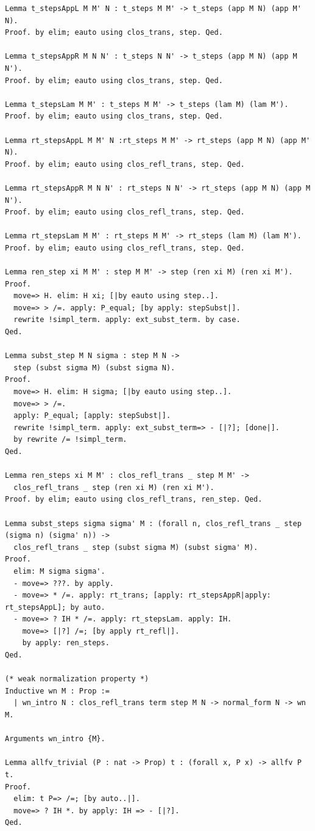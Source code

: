 \begin{lstlisting}
Lemma t_stepsAppL M M' N : t_steps M M' -> t_steps (app M N) (app M' N).
Proof. by elim; eauto using clos_trans, step. Qed.

Lemma t_stepsAppR M N N' : t_steps N N' -> t_steps (app M N) (app M N').
Proof. by elim; eauto using clos_trans, step. Qed.

Lemma t_stepsLam M M' : t_steps M M' -> t_steps (lam M) (lam M').
Proof. by elim; eauto using clos_trans, step. Qed.

Lemma rt_stepsAppL M M' N :rt_steps M M' -> rt_steps (app M N) (app M' N).
Proof. by elim; eauto using clos_refl_trans, step. Qed.

Lemma rt_stepsAppR M N N' : rt_steps N N' -> rt_steps (app M N) (app M N').
Proof. by elim; eauto using clos_refl_trans, step. Qed.

Lemma rt_stepsLam M M' : rt_steps M M' -> rt_steps (lam M) (lam M').
Proof. by elim; eauto using clos_refl_trans, step. Qed.

Lemma ren_step xi M M' : step M M' -> step (ren xi M) (ren xi M').
Proof.
  move=> H. elim: H xi; [|by eauto using step..].
  move=> > /=. apply: P_equal; [by apply: stepSubst|].
  rewrite !simpl_term. apply: ext_subst_term. by case.
Qed.

Lemma subst_step M N sigma : step M N ->
  step (subst sigma M) (subst sigma N).
Proof.
  move=> H. elim: H sigma; [|by eauto using step..].
  move=> > /=.
  apply: P_equal; [apply: stepSubst|].
  rewrite !simpl_term. apply: ext_subst_term=> - [|?]; [done|].
  by rewrite /= !simpl_term.
Qed.

Lemma ren_steps xi M M' : clos_refl_trans _ step M M' ->
  clos_refl_trans _ step (ren xi M) (ren xi M').
Proof. by elim; eauto using clos_refl_trans, ren_step. Qed.

Lemma subst_steps sigma sigma' M : (forall n, clos_refl_trans _ step (sigma n) (sigma' n)) ->
  clos_refl_trans _ step (subst sigma M) (subst sigma' M).
Proof.
  elim: M sigma sigma'.
  - move=> ???. by apply.
  - move=> * /=. apply: rt_trans; [apply: rt_stepsAppR|apply: rt_stepsAppL]; by auto.
  - move=> ? IH * /=. apply: rt_stepsLam. apply: IH.
    move=> [|?] /=; [by apply rt_refl|].
    by apply: ren_steps.
Qed.

(* weak normalization property *)
Inductive wn M : Prop :=
  | wn_intro N : clos_refl_trans term step M N -> normal_form N -> wn M.

Arguments wn_intro {M}.

Lemma allfv_trivial (P : nat -> Prop) t : (forall x, P x) -> allfv P t.
Proof.
  elim: t P=> /=; [by auto..|].
  move=> ? IH *. by apply: IH => - [|?].
Qed.


\end{lstlisting}
